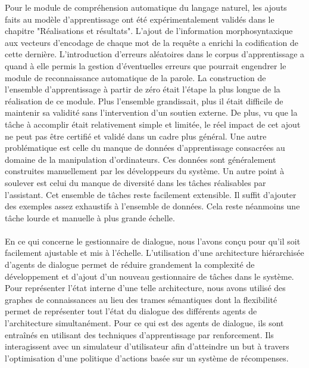 Pour le module de compréhension automatique du langage naturel, les ajouts faits au modèle d'apprentissage ont été expérimentalement validés dans le chapitre "Réalisations et résultats". L'ajout de l'information morphosyntaxique aux vecteurs d'encodage de chaque mot de la requête a enrichi la codification de cette dernière. L'introduction d'erreurs aléatoires dans le corpus d'apprentissage a quand à elle permis la gestion d'éventuelles erreurs que pourrait engendrer le module de reconnaissance automatique de la parole. La construction de l'ensemble d'apprentissage à partir de zéro était l'étape la plus longue de la réalisation de ce module. Plus l'ensemble grandissait, plus il était difficile de maintenir sa validité sans l'intervention d'un soutien externe. De plus, vu que la tâche à accomplir était relativement simple et limitée, le réel impact de cet ajout ne peut pas être certifié et validé dans un cadre plus général. Une autre problématique est celle du manque de données d'apprentissage consacrées au domaine de la manipulation d'ordinateurs. Ces données sont généralement construites manuellement par les développeurs du système. Un autre point à soulever est celui du manque de diversité dans les tâches réalisables par l'assistant. Cet ensemble de tâches reste facilement extensible. Il suffit d'ajouter des exemples assez exhaustifs à l'ensemble de données. Cela reste néanmoins une tâche lourde et manuelle à plus grande échelle.


\paragraph{}
En ce qui concerne le gestionnaire de dialogue, nous l'avons conçu pour qu'il soit facilement ajustable et mis à l'échelle. L'utilisation d'une architecture hiérarchisée d'agents de dialogue permet de réduire grandement la complexité de développement et d'ajout d'un nouveau gestionnaire de tâches dans le système.  Pour représenter l'état interne d'une telle architecture, nous avons utilisé des graphes de connaissances au lieu des trames sémantiques dont la flexibilité permet de représenter tout l'état du dialogue des différents agents de l'architecture simultanément. Pour ce qui est des agents de dialogue, ils sont entraînés en utilisant des techniques d'apprentissage par renforcement. Ils interagissent avec un simulateur d'utilisateur afin d'atteindre un but à travers l'optimisation d'une politique d'actions basée sur un système de récompenses.

